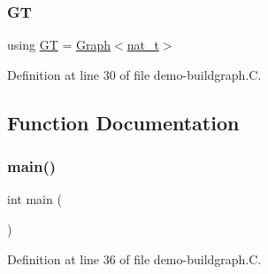 \subsubsection{\texorpdfstring{GT}{GT}}
{\footnotesize\ttfamily using \hyperlink{demo-buildgraph_8_c_a3001c40d2c31ca87ed96cd7d1334a55e}{GT} =  \hyperlink{class_designar_1_1_graph}{Graph}$<$\hyperlink{namespace_designar_aa72662848b9f4815e7bf31a7cf3e33d1}{nat\+\_\+t}$>$}



Definition at line 30 of file demo-\/buildgraph.\+C.



\subsection{Function Documentation}
\mbox{\label{demo-buildgraph_8_c_ae66f6b31b5ad750f1fe042a706a4e3d4}} 
\subsubsection{\texorpdfstring{main()}{main()}}
{\footnotesize\ttfamily int main (\begin{DoxyParamCaption}{ }\end{DoxyParamCaption})}



Definition at line 36 of file demo-\/buildgraph.\+C.

